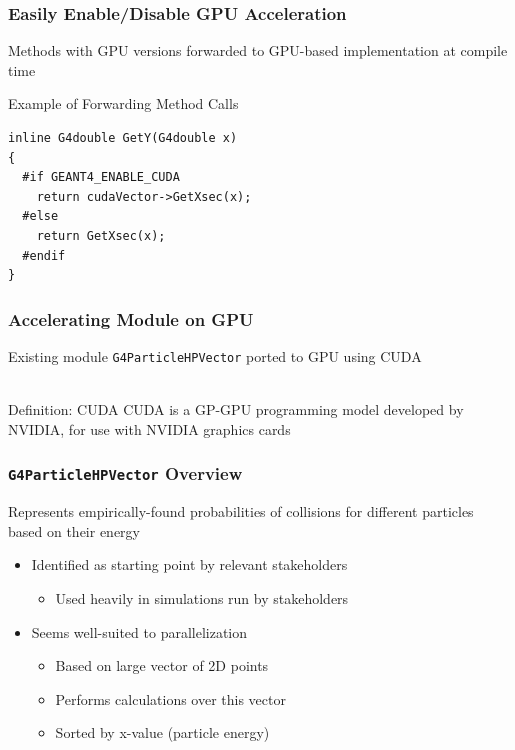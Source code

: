 \documentclass{beamer}
\begin{document}
\begin{frame}[fragile]
\frametitle{Easily Enable/Disable GPU Acceleration}
Methods with GPU versions forwarded to GPU-based implementation at compile time

\begin{block}{Example of Forwarding Method Calls}
\begin{lstlisting}
inline G4double GetY(G4double x)
{
  #if GEANT4_ENABLE_CUDA
    return cudaVector->GetXsec(x);
  #else
    return GetXsec(x);
  #endif
}
\end{lstlisting}
\end{block}
\end{frame}

\begin{frame}
\frametitle{Accelerating Module on GPU}
Existing module \texttt{G4ParticleHPVector} ported to GPU using CUDA\\~\\

\begin{block}{Definition: CUDA}
CUDA is a GP-GPU programming model developed by NVIDIA, for use with NVIDIA graphics cards
\end{block}
\end{frame}

\begin{frame}
\frametitle{\texttt{G4ParticleHPVector} Overview}
Represents empirically-found probabilities of collisions for different particles based on their energy

\begin{itemize}
\item Identified as starting point by relevant stakeholders
\begin{itemize}
\item Used heavily in simulations run by stakeholders
\end{itemize}
\item Seems well-suited to parallelization
\begin{itemize}
\item Based on large vector of 2D points
\item Performs calculations over this vector
\item Sorted by x-value (particle energy)
\end{itemize}
\end{itemize}
\end{frame}
\end{document}
